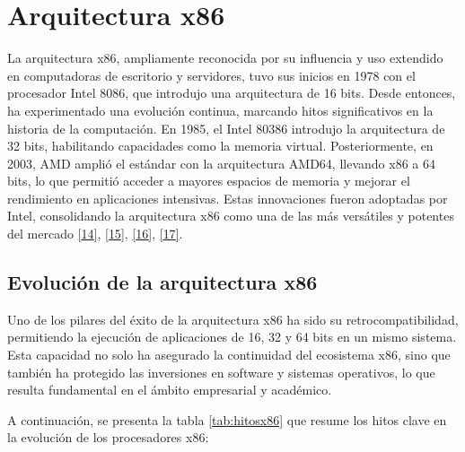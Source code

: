 \documentclass[12pt,oneside]{templates/unerthesis}
\begin{document}
\hypertarget{arquitectura-x86-1}{%
\section{Arquitectura x86}\label{arquitectura-x86-1}}

La arquitectura x86, ampliamente reconocida por su influencia y uso extendido en computadoras de escritorio y servidores, tuvo sus inicios en 1978 con el procesador Intel 8086, que introdujo una arquitectura de 16 bits. Desde entonces, ha experimentado una evolución continua, marcando hitos significativos en la historia de la computación. En 1985, el Intel 80386 introdujo la arquitectura de 32 bits, habilitando capacidades como la memoria virtual. Posteriormente, en 2003, AMD amplió el estándar con la arquitectura AMD64, llevando x86 a 64 bits, lo que permitió acceder a mayores espacios de memoria y mejorar el rendimiento en aplicaciones intensivas. Estas innovaciones fueron adoptadas por Intel, consolidando la arquitectura x86 como una de las más versátiles y potentes del mercado \protect\hyperlink{ref-stallings_computer_2013}{{[}14{]}}, \protect\hyperlink{ref-intel_64_2016}{{[}15{]}}, \protect\hyperlink{ref-amd_developer_2019}{{[}16{]}}, \protect\hyperlink{ref-abel_ibm_2000}{{[}17{]}}.

\hypertarget{evoluciuxf3n-de-la-arquitectura-x86}{%
\subsection{Evolución de la arquitectura x86}\label{evoluciuxf3n-de-la-arquitectura-x86}}

Uno de los pilares del éxito de la arquitectura x86 ha sido su retrocompatibilidad, permitiendo la ejecución de aplicaciones de 16, 32 y 64 bits en un mismo sistema. Esta capacidad no solo ha asegurado la continuidad del ecosistema x86, sino que también ha protegido las inversiones en software y sistemas operativos, lo que resulta fundamental en el ámbito empresarial y académico.

A continuación, se presenta la tabla \ref{tab:hitosx86} que resume los hitos clave en la evolución de los procesadores x86:
\end{document}
